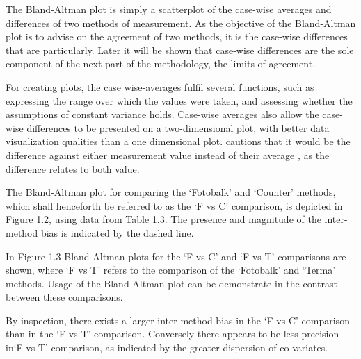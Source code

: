 \documentclass[Main.tex]{subfiles}
\begin{document}
	The Bland-Altman plot is simply a scatterplot of the case-wise
	averages and differences of two methods of measurement. As the
	objective of the Bland-Altman plot is to advise on the agreement
	of two methods, it is the case-wise differences that are
	particularly. Later it will be shown that case-wise differences
	are the sole component of the next part of the methodology, the
	limits of agreement.
	
	For creating plots, the case wise-averages fulfil several
	functions, such as expressing the range over which the values were
	taken, and assessing whether the assumptions of constant variance
	holds. Case-wise averages also allow the case-wise differences to
	be presented on a two-dimensional plot, with better data
	visualization qualities than a one dimensional plot. \citet{BA86}
	cautions that it would be the difference against either
	measurement value instead of their average , as the difference
	relates to both value.
	
	The Bland-Altman plot for comparing the `Fotobalk' and `Counter'
	methods, which shall henceforth be referred to as the `F vs C'
	comparison,  is depicted in Figure 1.2, using data from Table 1.3.
	The presence and magnitude of the inter-method bias is indicated
	by the dashed line.
	
%	
%	
	
	In Figure 1.3 Bland-Altman plots for the `F vs C' and `F vs T'
	comparisons are shown, where `F vs T' refers to the comparison of
	the `Fotobalk' and `Terma' methods. Usage of the Bland-Altman plot
	can be demonstrate in the contrast between these comparisons.
	
	
	By inspection, there exists a larger inter-method bias in the `F
	vs C' comparison than in the `F vs T' comparison. Conversely there
	appears to be less precision in`F vs T' comparison, as indicated
	by the greater dispersion of co-variates.
	
\end{document}
